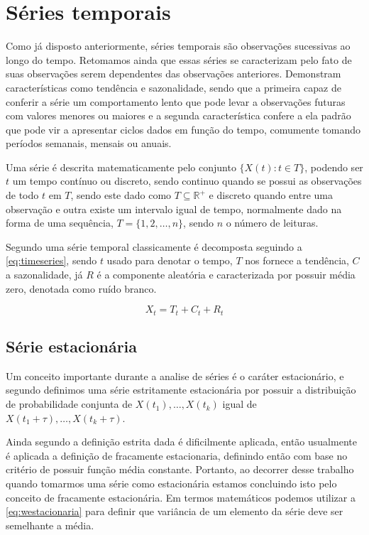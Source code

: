 \documentclass[
    12pt,
    oneside,
    a4paper,
    english,
    brazil
]{abntex2}
\begin{document}
\section{Séries temporais}

Como já disposto anteriormente, séries temporais são observações sucessivas ao
longo do tempo. Retomamos ainda que essas séries se caracterizam pelo fato de
suas observações serem dependentes das observações anteriores. Demonstram
características como tendência e sazonalidade, sendo que a primeira capaz de
conferir a série um comportamento lento que pode levar a observações futuras
com valores menores ou maiores e a segunda característica confere a ela padrão
que pode vir a apresentar ciclos dados em função do tempo, comumente tomando
períodos semanais, mensais ou anuais.

Uma série é descrita matematicamente pelo conjunto $\{X(t): t \in T\}$, podendo
ser $t$ um tempo contínuo ou discreto, sendo continuo quando se possui as
observações de todo $t$ em $T$, sendo este dado como $T \subseteq
\mathbb{R}^{+}$ e discreto quando entre uma observação e outra existe um
intervalo igual de tempo, normalmente dado na forma de uma sequência, $T = \{1,
2, \ldots, n\}$, sendo $n$ o número de leituras.

Segundo  uma série temporal classicamente é decomposta
seguindo a \autoref{eq:timeseries}, sendo $t$ usado para denotar o tempo, $T$
nos fornece a tendência, $C$ a sazonalidade, já $R$ é a componente aleatória e
caracterizada por possuir média zero, denotada como ruído branco.

\begin{equation}
    \label{eq:timeseries}
    X_t = T_t + C_t + R_t
\end{equation}

\subsection{Série estacionária}

Um conceito importante durante a analise de séries é o caráter estacionário, e
segundo  definimos uma série estritamente estacionária por
possuir a distribuição de probabilidade conjunta de $X(t_1), \ldots, X(t_k)$
igual de $X(t_1 + \tau), \ldots, X(t_k + \tau)$.

Ainda segundo  a definição estrita dada é dificilmente
aplicada, então usualmente é aplicada a definição de fracamente estacionaria,
definindo então com base no critério de possuir função média constante.
Portanto, ao decorrer desse trabalho quando tomarmos uma série como
estacionária estamos concluindo isto pelo conceito de fracamente estacionária.
Em termos matemáticos podemos utilizar a \autoref{eq:westacionaria} para
definir que variância de um elemento da série deve ser semelhante a média.
\end{document}
